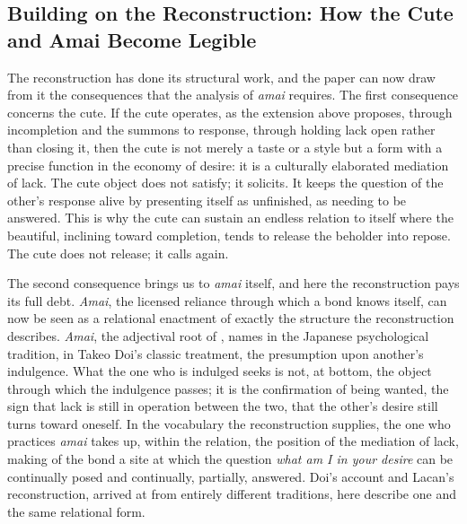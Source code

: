 \subsection{Building on the Reconstruction: How the Cute and Amai Become Legible}

The reconstruction has done its structural work, and the paper can now draw from it the consequences that the analysis of \textit{amai} requires. The first consequence concerns the cute. If the cute operates, as the extension above proposes, through incompletion and the summons to response, through holding lack open rather than closing it, then the cute is not merely a taste or a style but a form with a precise function in the economy of desire: it is a culturally elaborated mediation of lack. The cute object does not satisfy; it solicits. It keeps the question of the other's response alive by presenting itself as unfinished, as needing to be answered. This is why the cute can sustain an endless relation to itself where the beautiful, inclining toward completion, tends to release the beholder into repose. The cute does not release; it calls again.

The second consequence brings us to \textit{amai} itself, and here the reconstruction pays its full debt. \textit{Amai}, the licensed reliance through which a bond knows itself, can now be seen as a relational enactment of exactly the structure the reconstruction describes. \textit{Amai}, the adjectival root of , names in the Japanese psychological tradition, in Takeo Doi's classic treatment, the presumption upon another's indulgence. What the one who is indulged seeks is not, at bottom, the object through which the indulgence passes; it is the confirmation of being wanted, the sign that lack is still in operation between the two, that the other's desire still turns toward oneself. In the vocabulary the reconstruction supplies, the one who practices \textit{amai} takes up, within the relation, the position of the mediation of lack, making of the bond a site at which the question \textit{what am I in your desire} can be continually posed and continually, partially, answered. Doi's account and Lacan's reconstruction, arrived at from entirely different traditions, here describe one and the same relational form.

